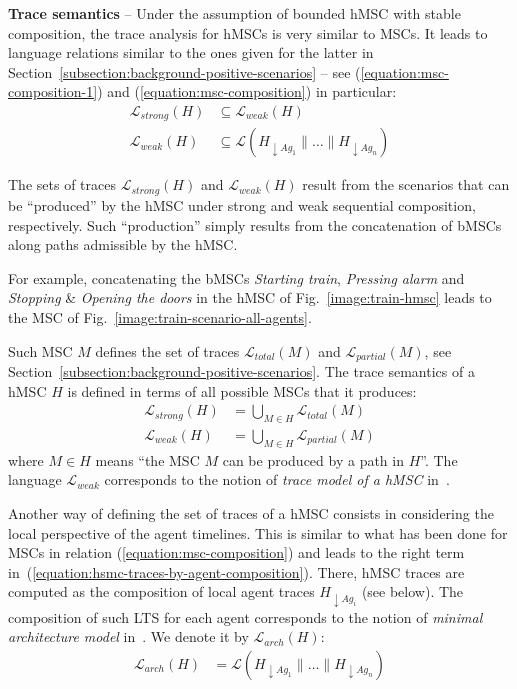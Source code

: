\noindent \textbf{Trace semantics} -- Under the assumption of bounded hMSC with stable composition, the trace analysis for hMSCs is very similar to MSCs. It leads to language relations similar to the ones given for the latter in Section~\ref{subsection:background-positive-scenarios} -- see (\ref{equation:msc-composition-1}) and (\ref{equation:msc-composition}) in particular:
\begin{align}
\mathcal{L}_{strong}(H) & \subseteq \mathcal{L}_{weak}(H) \\
\mathcal{L}_{weak}(H) & \subseteq \mathcal{L}(H_{\downarrow Ag_1} \parallel \ldots \parallel H_{\downarrow Ag_n})
\label{equation:hsmc-traces-by-agent-composition}
\end{align}

The sets of traces $\mathcal{L}_{strong}(H)$ and $\mathcal{L}_{weak}(H)$ result from the scenarios that can be ``produced'' by the hMSC under strong and weak sequential composition, respectively. Such ``production'' simply results from the concatenation of bMSCs along paths admissible by the hMSC.

For example, concatenating the bMSCs \emph{Starting train}, \emph{Pressing alarm} and \emph{Stopping} \& \emph{Opening the doors} in the hMSC of Fig.~\ref{image:train-hmsc} leads to the MSC of Fig.~\ref{image:train-scenario-all-agents}. 

Such MSC $M$ defines the set of traces $\mathcal{L}_{total}(M)$ and $\mathcal{L}_{partial}(M)$, see Section~\ref{subsection:background-positive-scenarios}. The trace semantics of a hMSC $H$ is defined in terms of all possible MSCs that it produces: 
\begin{align*}
\mathcal{L}_{strong}(H) &= \bigcup_{M \in H} \mathcal{L}_{total}(M) \\
\mathcal{L}_{weak}(H) &= \bigcup_{M \in H} \mathcal{L}_{partial}(M)
\end{align*}
\noindent where $M \in H$ means ``the MSC $M$ can be produced by a path in $H$''. The language $\mathcal{L}_{weak}$ corresponds to the notion of \emph{trace model of a hMSC} in~\cite{Uchitel:2004}.

Another way of defining the set of traces of a hMSC consists in considering the local perspective of the agent timelines. This is similar to what has been done for MSCs in relation (\ref{equation:msc-composition}) and leads to the right term in~(\ref{equation:hsmc-traces-by-agent-composition}). There, hMSC traces are computed as the composition of local agent traces $H_{\downarrow Ag_i}$ (see below). The composition of such LTS for each agent corresponds to the notion of \emph{minimal architecture model} in~\cite{Uchitel:2004}. We denote it by $\mathcal{L}_{arch}(H)$:
\begin{align}
\mathcal{L}_{arch}(H) &= \mathcal{L}(H_{\downarrow Ag_1} \parallel \ldots \parallel H_{\downarrow Ag_n})
\end{align}

